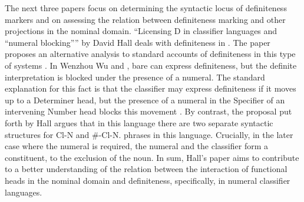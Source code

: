 \documentclass[output=paper]{langsci/langscibook}
\begin{document}
The next three papers focus on determining the syntactic locus of definiteness markers and on assessing the relation between definiteness marking and other projections in the nominal domain. “Licensing D in classifier languages and ``numeral blocking''” by David Hall deals with definiteness in . The paper proposes an alternative analysis to standard accounts of definiteness in this type of systems \citep{ChengSybesma1999,Simpson2005}. In Wenzhou Wu and , bare  can express definiteness, but the definite interpretation is blocked under the presence of a numeral. The standard explanation for this fact is that the classifier may express definiteness if it moves up to a Determiner head, but the presence of a numeral in the Specifier of an intervening Number head blocks this movement \citep{Simpson2005}. By contrast, the proposal put forth by Hall argues that in this language there are two separate syntactic structures for Cl-N and \#-Cl-N. phrases in this language. Crucially, in the later case where the numeral is required, the numeral and the classifier form a constituent, to the exclusion of the noun. In sum, Hall’s paper aims to contribute to a better understanding of the relation between the interaction of functional heads in the nominal domain and definiteness, specifically, in numeral classifier languages.
\end{document}
